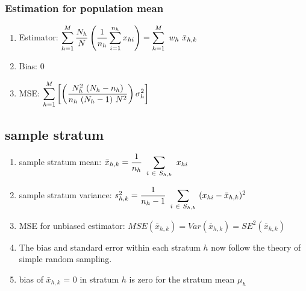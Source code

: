 \subsubsection{Estimation for population mean}
\begin{enumerate}[itemsep=0.3cm]
    \item Estimator: $
        \displaystyle\sum_{h=1}^{M}
        \dfrac{N_h}{N}
        \left(\dfrac{1}{n_h} \displaystyle\sum_{i=1}^{n_h} x_{hi}\right)
        =
        \displaystyle\sum_{h=1}^{M} \ w_h \ \bar{x}_{h,k}
    $
    \hfill \cite{statistics/book/Statistics-for-Data-Scientists/Maurits-Kaptein}
    
    \item Bias: $0$
    \hfill \cite{statistics/book/Statistics-for-Data-Scientists/Maurits-Kaptein}

    \item MSE: $
        \displaystyle\sum_{h=1}^{M}
        \left[
            \left(
                \dfrac{
                    N_h^2\ (N_h - n_h)
                }{
                    n_h\ (N_h-1)\ N^2
                }
            \right) \sigma_h^2
        \right]
    $
    \hfill \cite{statistics/book/Statistics-for-Data-Scientists/Maurits-Kaptein}
\end{enumerate}




\subsection{sample stratum}
\begin{enumerate}[itemsep=0.2cm]
    \item sample stratum mean: $
        \bar{x}_{h,k} = \dfrac{1}{n_h} \ \displaystyle\sum_{i \ \in \ S_{h,k}} \ x_{hi}
    $
    \hfill \cite{statistics/book/Statistics-for-Data-Scientists/Maurits-Kaptein}

    \item sample stratum variance: $
        s^2_{h,k} = \dfrac{1}{n_h-1} \ \displaystyle\sum_{i \ \in \ S_{h,k}} \ (x_{hi} - \bar{x}_{h,k})^2
    $
    \hfill \cite{statistics/book/Statistics-for-Data-Scientists/Maurits-Kaptein}

    \item MSE for unbiased estimator: 
    $
        MSE(\bar{x}_{h,k}) = Var(\bar{x}_{h,k}) = SE^2(\bar{x}_{h,k})
    $
    \hfill \cite{common/online/chatgpt}

    \item The bias and standard error within each stratum $h$ now follow the theory of simple random sampling.
    \hfill \cite{statistics/book/Statistics-for-Data-Scientists/Maurits-Kaptein}

    \item bias of $\bar{x}_{h,k}$ = 0 in stratum $h$ is zero for the stratum mean $\mu_h$

\end{enumerate}


